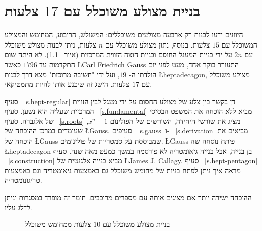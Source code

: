 

\chapter{בניית מצולע משוכלל עם 
$17$
צלעות}
\label{c.heptadecagon}


היוונים ידעו לבנות רק ארבעה מצולעים משוכללים: המשולש, הריבוע, המחומש והמצולע המשוכלל עם 
$15$
צלעות. בנוסף, נתון מצולע משוכלל עם
$n$
צלעות, ניתן לבנות מצולע משוכלל עם
$2n$
על ידי בניית המעגל החוסם ובניית חוצה הזווית המרכזית (איור%
~\ref{f.hept-double}).
לא היתה שום התקדמות עד
$1796$
כאשר
\L{Carl Friedrich Gauss}
התעורר בוקר אחד, מעט לפני יום הולדתו ה-%
$19$,
ועל ידי "חשיבה מרוכזת" מצא דרך לבנות 
\L{heptadecagon},
מצולע משוכלל עם
$17$
צלעות. הישג זה שיכנע אותו להיות מתמטיקאי.

סעיף%
~\ref{s.hept-regular}
דן בקשר בין צלע של מצולע החסום על ידי מעגל לבין הזווית המרכזית שעליה הוא נשען. סעיף%
~\ref{s.fundamental}
מביא ללא הוכחה את המשפט הבסיסי של אלגברה. סעיף%
~\ref{s.roots}
מציג את שורשי היחידה, השורשים של הפולינום
$x^n-1$,
שעומדים במרכז ההוכחה של
\L{Gauss}.
סעיפים%
~\ref{s.gauss}
ו-%
~\ref{s.derivation}
מביאים את הוכחה של
\L{Gauss}
שמבוססת על סמטריות של פולינומים.
\L{Gauss}
פיתח נוסחה שה-%
\L{heptadecagon}
בן-בנייה, אבל בנייה גיאומטריה לא פורסמה במשך כמעט מאה שנה. סעיף%
~\ref{s.construction}
מביא בנייה אלגנטית של
\L{James J. Callagy}.
סעיף%
~\ref{s.hept-pentagon}
מראה איך ניתן לפתח בניות של מחומש משוכלל גם באמצעות גיאומטריה וגם באמצעות טריגונומטריה.

ההוכחה ישירה יותר אם מציגים אותה עם מספרים מרוכבים. חומר זה מופרד במסגרות וניתן לדלג עליו.
\begin{figure}[tb]
\begin{center}
\end{center}
\caption{בניית מצולע משוכלל עם $10$ צלעות ממחומש משוכלל}\label{f.hept-double}
\end{figure}

